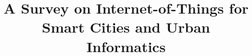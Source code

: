 \documentclass[10pt,journal]{IEEEtran}
\begin{document}
\title{A Survey on Internet-of-Things for Smart Cities and Urban Informatics}



\author{
}

\pagestyle{plain} %



\maketitle












\small{

	}
\end{document}
